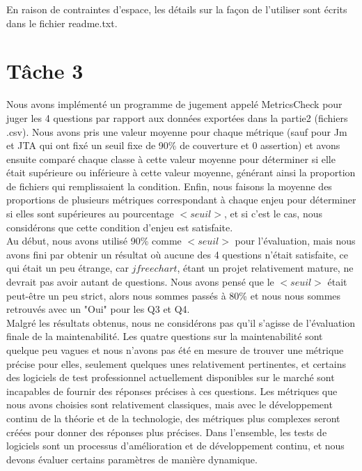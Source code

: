\documentclass{article}
\begin{document}
En raison de contraintes d'espace, les détails sur la façon de l'utiliser sont écrits dans le fichier readme.txt.

\section*{Tâche 3}
Nous avons implémenté un programme de jugement appelé MetricsCheck pour juger les 4 questions par rapport aux données exportées dans la partie2 (fichiers .csv). Nous avons pris une valeur moyenne pour chaque métrique (sauf pour Jm et JTA qui ont fixé un seuil fixe de 90\% de couverture et 0 assertion) et avons ensuite comparé chaque classe à cette valeur moyenne pour déterminer si elle était supérieure ou inférieure à cette valeur moyenne, générant ainsi la proportion de fichiers qui remplissaient la condition. Enfin, nous faisons la moyenne des proportions de plusieurs métriques correspondant à chaque enjeu pour déterminer si elles sont supérieures au pourcentage $<seuil>$, et si c'est le cas, nous considérons que cette condition d'enjeu est satisfaite.\\
Au début, nous avons utilisé 90\% comme $<seuil>$ pour l'évaluation, mais nous avons fini par obtenir un résultat où aucune des 4 questions n'était satisfaite, ce qui était un peu étrange, car $jfreechart$, étant un projet relativement mature, ne devrait pas avoir autant de questions. Nous avons pensé que le $<seuil>$ était peut-être un peu strict, alors nous sommes passés à 80\% et nous nous sommes retrouvés avec un "Oui" pour les Q3 et Q4.\\
Malgré les résultats obtenus, nous ne considérons pas qu'il s'agisse de l'évaluation finale de la maintenabilité. Les quatre questions sur la maintenabilité sont quelque peu vagues et nous n'avons pas été en mesure de trouver une métrique précise pour elles, seulement quelques unes relativement pertinentes, et certains des logiciels de test professionnel actuellement disponibles sur le marché sont incapables de fournir des réponses précises à ces questions. Les métriques que nous avons choisies sont relativement classiques, mais avec le développement continu de la théorie et de la technologie, des métriques plus complexes seront créées pour donner des réponses plus précises. Dans l'ensemble, les tests de logiciels sont un processus d'amélioration et de développement continu, et nous devons évaluer certains paramètres de manière dynamique.
\end{document}

